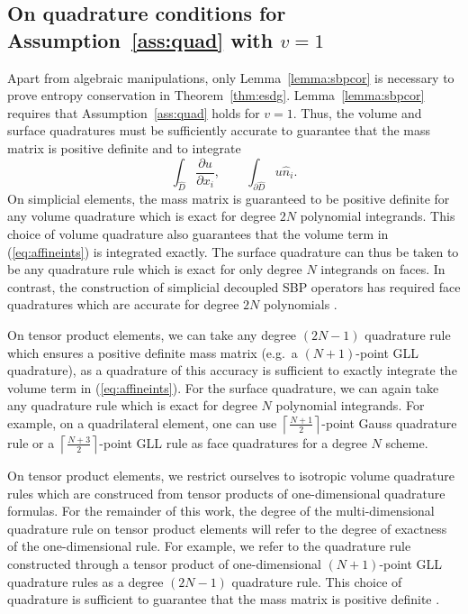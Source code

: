 \documentclass{svjour3}                     %
\renewcommand{\hat}{\widehat}
\newcommand{\pd}[2]{\frac{\partial#1}{\partial#2}}
\begin{document}
\subsection{On quadrature conditions for Assumption~\ref{ass:quad} with $v = 1$}
\label{sec:assump1}
Apart from algebraic manipulations, only Lemma~\ref{lemma:sbpcor} is necessary to prove entropy conservation in Theorem~\ref{thm:esdg}.  Lemma~\ref{lemma:sbpcor} requires that Assumption~\ref{ass:quad} holds for $v=1$.  Thus, the volume and surface quadratures must be sufficiently accurate to guarantee that the mass matrix is positive definite and to integrate 
\begin{equation}
\int_{\hat{D}} \pd{u}{x_i}, \qquad \int_{\partial \hat{D}} u \hat{n}_i. \label{eq:affineints}
\end{equation}
On simplicial elements, the mass matrix is guaranteed to be positive definite for any volume quadrature which is exact for degree $2N$ polynomial integrands.  This choice of volume quadrature also guarantees that the volume term in (\ref{eq:affineints}) is integrated exactly.  The surface quadrature can thus be taken to be any quadrature rule which is exact for only degree $N$ integrands on faces.  In contrast, the construction of simplicial decoupled SBP operators has required face quadratures which are accurate for degree $2N$ polynomials \cite{chan2017discretely, chan2018discretely}.  

On tensor product elements, we can take any degree $(2N-1)$ quadrature rule which ensures a positive definite mass matrix (e.g.\ a $(N+1)$-point GLL quadrature), as a quadrature of this accuracy is sufficient to exactly integrate the volume term in (\ref{eq:affineints}).  For the surface quadrature, we can again take any quadrature rule which is exact for degree $N$ polynomial integrands.  For example, on a quadrilateral element, one can use $\left\lceil\frac{N+1}{2}\right\rceil$-point Gauss quadrature rule or a $\left\lceil\frac{N+3}{2}\right\rceil$-point GLL rule as face quadratures for a degree $N$ scheme.  


On tensor product elements, we restrict ourselves to isotropic volume quadrature rules which are construced from tensor products of one-dimensional quadrature formulas.  For the remainder of this work, the degree of the multi-dimensional quadrature rule on tensor product elements will refer to the degree of exactness of the one-dimensional rule.  For example, we refer to the quadrature rule constructed through a tensor product of one-dimensional $(N+1)$-point GLL quadrature rules as a degree $(2N-1)$ quadrature rule.  This choice of quadrature is sufficient to guarantee that the mass matrix is positive definite \cite{canuto2007spectral}.  
\end{document}
